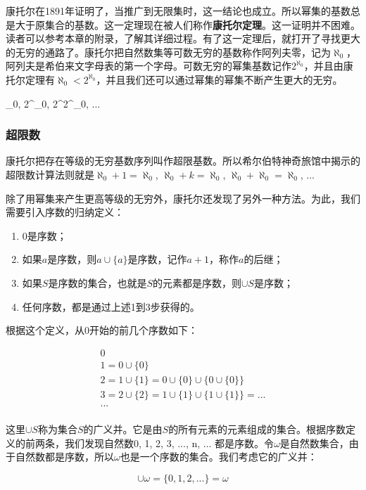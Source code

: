 \documentclass{article}
\begin{document}
康托尔在1891年证明了，当推广到无限集时，这一结论也成立。所以幂集的基数总是大于原集合的基数。这一定理现在被人们称作\textbf{康托尔定理}。这一证明并不困难。读者可以参考本章的附录，了解其详细过程。有了这一定理后，就打开了寻找更大的无穷的通路了。康托尔把自然数集等可数无穷的基数称作阿列夫零，记为$\aleph_0$，阿列夫是希伯来文字母表的第一个字母。可数无穷的幂集基数记作$2^{\aleph_0}$，并且由康托尔定理有$\aleph_0 < 2^{\aleph_0}$，并且我们还可以通过幂集的幂集不断产生更大的无穷。

\be
\aleph_0, 2^{\aleph_0}, 2^{2^{\aleph_0}}, ...
\ee

\subsubsection{超限数}
康托尔把存在等级的无穷基数序列叫作超限基数。所以希尔伯特神奇旅馆中揭示的超限数计算法则就是$\aleph_0 + 1 = \aleph_0$, $\aleph_0 + k = \aleph_0 $, $\aleph_0 + \aleph_0 = \aleph_0$, ...

除了用幂集来产生更高等级的无穷外，康托尔还发现了另外一种方法。为此，我们需要引入序数的归纳定义：

\begin{enumerate}
\item 0是序数；
\item 如果$a$是序数，则$a \cup \{a\}$是序数，记作$a + 1$，称作$a$的后继；
\item 如果$S$是序数的集合，也就是$S$的元素都是序数，则$\cup S$是序数；
\item 任何序数，都是通过上述1到3步获得的。
\end{enumerate}

根据这个定义，从0开始的前几个序数如下：

\[
\begin{array}{l}
0 \\
1 = 0 \cup \{0\} \\
2 = 1 \cup \{1\} = 0 \cup \{0\} \cup \{0 \cup \{0\}\} \\
3 = 2 \cup \{2\} = 1 \cup \{1\} \cup \{1 \cup \{1\}\} = ... \\
... \\
\end{array}
\]

这里$\cup S$称为集合$S$的广义并。它是由$S$的所有元素的元素组成的集合。根据序数定义的前两条，我们发现自然数0, 1, 2, 3, ..., n, ... 都是序数。令$\omega$是自然数集合，由于自然数都是序数，所以$\omega$也是一个序数的集合。我们考虑它的广义并：

\[
\cup \omega = \{0, 1, 2, ...\} = \omega
\]
\end{document}
